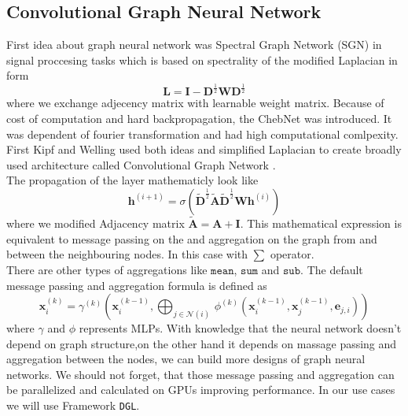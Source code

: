 \subsection{Convolutional Graph Neural Network}
First idea about graph neural network was Spectral Graph Network (SGN) \cite{sgn} in signal proccesing tasks which is based on spectrality of the modified  Laplacian in form \begin{equation}
	\mathbf{L}= \mathbf{I} - \mathbf{D}^{\frac{1}{2}}\mathbf{W}\mathbf{D}^{\frac{1}{2}} 
\end{equation}where we exchange adjecency matrix with learnable weight matrix.
Because of cost of computation and hard backpropagation, the ChebNet was introduced\cite{cheb}. 
It was dependent of fourier transformation and had high computational comlpexity.
First Kipf and Welling used both ideas and simplified Laplacian to create broadly used architecture called Convolutional Graph Network \cite{gcn}. \\
The propagation of the layer mathematicly look like
\begin{equation}
	\mathbf{h}^{(i+1)}=\sigma(\tilde{\mathbf{D}}^{\frac{1}{2}}\tilde{\mathbf{A}}\tilde{\mathbf{D}}^{\frac{1}{2}}\mathbf{W}\mathbf{h}^{(i)})
\end{equation} where we modified Adjacency matrix $\tilde{\mathbf{A}}=\mathbf{A}+ \mathbf{I}$.
This mathematical expression is equivalent to message passing on the  and aggregation on the graph from and between the neighbouring nodes. In this case with $\sum$ operator.\\ There are other types of aggregations like $\texttt{mean}$, $\texttt{sum}$ and $\texttt{sub}$. 
The default message passing and aggregation formula is defined as
\begin{equation}
\mathbf{x}_i^{(k)} = \gamma^{(k)} \left( \mathbf{x}_i^{(k-1)}, \bigoplus_{j \in \mathcal{N}(i)} \, \phi^{(k)}\left(\mathbf{x}_i^{(k-1)}, \mathbf{x}_j^{(k-1)},\mathbf{e}_{j,i}\right) \right) 
\end{equation} where $\gamma$ and $\phi$ represents MLPs.  
With knowledge that the neural network doesn't depend on graph structure,on the other hand it depends on massage passing and aggregation between the nodes, we can build more designs of graph neural networks. We should not forget, that those message passing and aggregation can be parallelized and calculated on GPUs improving performance. In our use cases we will use Framework \texttt{DGL}\cite{dgl}.


